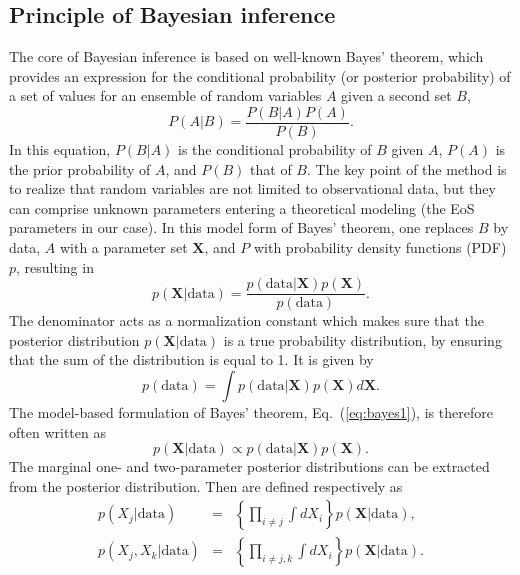 \subsection{Principle of Bayesian inference}\label{subsec:bayes}

The core of Bayesian inference is based on well-known Bayes' theorem, 
which provides an expression for the conditional probability (or posterior
probability) of a set of values for an ensemble of random variables $A$ given a
second set $B$,
%
\begin{equation}
  P(A|B) = \frac{P(B|A)P(A)}{P(B)}.
\end{equation}
%
In this equation, $P(B|A)$ is the conditional probability of $B$ given $A$, 
$P(A)$ is the prior probability of $A$, and $P(B)$ that of $B$. 
The key point of the method is to realize that random variables are not limited
to observational data, but they can comprise unknown parameters entering a
theoretical modeling (the EoS parameters in our case). 
In this model form of Bayes' theorem, one replaces $B$ by data, $A$ with 
a parameter set $\bm{X}$, and $P$ with probability density functions (PDF) 
$p$, resulting in~\cite{Bayes}
%
\begin{equation}
  p(\bm{X}|\text{data}) = \frac{p(\text{data}|\bm{X})
  p(\bm{X})}{p(\text{data})}.\label{eq:bayes1}
\end{equation}
%
The denominator acts as a normalization constant which makes 
sure that the posterior distribution $p(\bm{X}|\text{data})$ is a 
true probability distribution, by ensuring that the sum of the distribution is 
equal to 1. It is given by
%
\begin{equation}
  p(\text{data}) = \int p(\text{data}|\bm{X})p(\bm{X})
  d\bm{X}.
\end{equation}
%
The model-based formulation of Bayes' theorem, Eq.~(\ref{eq:bayes1}), is 
therefore often written as
%
\begin{equation}
  p(\bm{X}|\text{data}) \propto p(\text{data}|\bm{X})
  p(\bm{X}).
\end{equation}
%
The marginal one- and two-parameter posterior distributions can be extracted
from the posterior distribution. Then are defined respectively as
%
\begin{eqnarray}
  p(X_j|\text{data}) &=& \left\{\prod_{i \neq j} \int
  dX_i\right\}p(\bm{X}|\text{data}),\label{eq:marg1}\\
  p(X_j,X_k|\text{data}) &=& \left\{\prod_{i \neq j,k} 
    \int dX_i\right\}p(\bm{X}|\text{data}).
\end{eqnarray}
%

